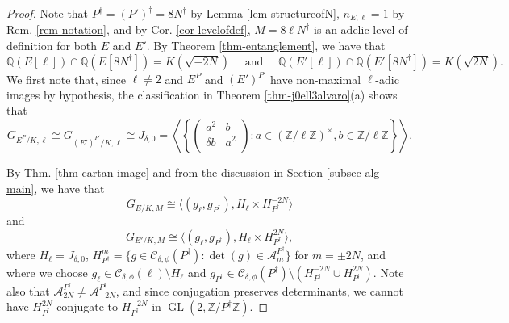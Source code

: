 \documentclass[11pt]{amsart}
\theoremstyle{definition}
\newcommand{\Q}{\mathbb{Q}}
\newcommand{\Z}{\mathbb{Z}}
\newcommand{\GL}{\operatorname{GL}}
\begin{document}
\begin{proof}
    Note that $P^{\dagger} = (P')^{\dagger} = 8 N^{\dagger}$ by Lemma \ref{lem-structureofN}, $n_{E, \ell} = 1$ by Rem. \ref{rem-notation}, and by Cor. \ref{cor-levelofdef}, $M = 8 \ell N^{\dagger}$ is an adelic level of definition for both $E$ and $E'$. By Theorem \ref{thm-entanglement}, we have that 
    \[ \Q(E[\ell]) \cap \Q(E[8 N^{\dagger}]) = K(\sqrt{-2 N}) \quad \text{ and } \quad  \Q(E'[\ell]) \cap \Q(E'[8 N^{\dagger}]) = K(\sqrt{2 N}).\]
     We first note that, since $\ell \neq 2$ and $E^{P}$ and $(E')^{P'}$ have non-maximal $\ell$-adic images by hypothesis, the classification in Theorem \ref{thm-j0ell3alvaro}(a) shows that
    \[ G_{E^P/K, \ell} \cong G_{(E')^{P'}/K, \ell} \cong J_{\delta, 0} = \left\langle \left\{ \left(\begin{array}{cc} a^2 & b\\ \delta b & a^2 \\ \end{array}\right): a \in (\Z/\ell\Z)^\times, b \in \Z/\ell\Z \right\} \right\rangle.\]
    
    By Thm. \ref{thm-cartan-image} and from the discussion in Section \ref{subsec-alg-main}, we have that
    \[ G_{E/K, M} \cong \langle (g_{\ell}, g_{P^{\dagger}}), H_{\ell} \times H_{P^{\dagger}}^{-2N} \rangle \]
    and 
    \[ G_{E'/K, M} \cong \langle (g_{\ell}, g_{P^{\dagger}}), H_{\ell} \times H_{P^{\dagger}}^{2N} \rangle, \]
    where $H_{\ell} = J_{\delta, 0}$, $H_{P^{\dagger}}^{m} = \{ g \in \mathcal{C}_{\delta, \phi}(P^{\dagger}) : \det(g) \in \mathcal{A}_m^{P^{\dagger}} \}$
    for $m = \pm 2N$, and where we choose $g_{\ell} \in \mathcal{C}_{\delta, \phi}(\ell) \setminus H_{\ell}$ and $g_{P^{\dagger}} \in \mathcal{C}_{\delta, \phi}(P^{\dagger}) \setminus (H_{P^{\dagger}}^{-2N} \cup H_{P^{\dagger}}^{2N})$. %
    Note also that $\mathcal{A}_{2N}^{P^{\dagger}} \neq \mathcal{A}_{-2N}^{P^{\dagger}}$, and since conjugation preserves determinants, we cannot have $H_{P^{\dagger}}^{2N}$ conjugate to $H_{P^{\dagger}}^{-2N}$ in $\GL(2, \Z/P^{\dagger}\Z)$. 


\end{proof}
\end{document}
